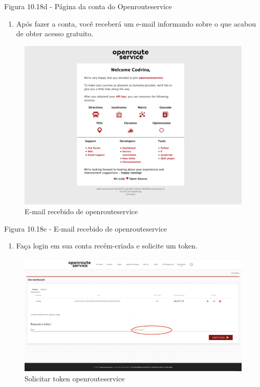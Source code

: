 \documentclass[
]{krantz}
\providecommand{\tightlist}{%
  \setlength{\itemsep}{0pt}\setlength{\parskip}{0pt}}
\begin{document}
Figura 10.18d - Página da conta do Openrouteservice

\begin{enumerate}
\def\labelenumi{\arabic{enumi}.}
\setcounter{enumi}{2}
\tightlist
\item
  Após fazer a conta, você receberá um e-mail informando sobre o que acabou de obter acesso gratuito.
\end{enumerate}

\begin{figure}
\centering
\includegraphics{media/modulo10/fig1018_e.png}
\caption{E-mail recebido de openrouteservice}
\end{figure}

Figura 10.18e - E-mail recebido de openrouteservice

\begin{enumerate}
\def\labelenumi{\arabic{enumi}.}
\setcounter{enumi}{3}
\tightlist
\item
  Faça login em sua conta recém-criada e solicite um token.
\end{enumerate}

\begin{figure}
\centering
\includegraphics{media/modulo10/fig1018_f.png}
\caption{Solicitar token openrouteservice}
\end{figure}
\end{document}
